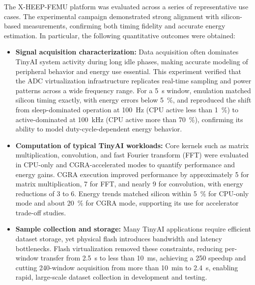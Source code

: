             The \mbox{X-HEEP-FEMU} platform was evaluated across a series of representative use cases. The experimental campaign demonstrated strong alignment with silicon-based measurements, confirming both timing fidelity and accurate energy estimation. In particular, the following quantitative outcomes were obtained:
    
            \vspace{-1em}
            \begin{itemize}
                \item \textbf{Signal acquisition characterization:} Data acquisition often dominates TinyAI system activity during long idle phases, making accurate modeling of peripheral behavior and energy use essential. This experiment verified that the ADC virtualization infrastructure replicates real-time sampling and power patterns across a wide frequency range. For a \SI{5}{\second} window, emulation matched silicon timing exactly, with energy errors below \SI{5}{\percent}, and reproduced the shift from sleep-dominated operation at \SI{100}{\hertz} (CPU active less than \SI{1}{\percent}) to active-dominated at \SI{100}{\kilo\hertz} (CPU active more than \SI{70}{\percent}), confirming its ability to model duty-cycle-dependent energy behavior.
            
                \item \textbf{Computation of typical TinyAI workloads:} Core kernels such as matrix multiplication, convolution, and fast Fourier transform (FFT) were evaluated in CPU-only and CGRA-accelerated modes to quantify performance and energy gains. CGRA execution improved performance by approximately \SI{5}{\times} for matrix multiplication, \SI{7}{\times} for FFT, and nearly \SI{9}{\times} for convolution, with energy reductions of \SI{3}{\times} to \SI{6}{\times}. Energy trends matched silicon within \SI{5}{\percent} for CPU-only mode and about \SI{20}{\percent} for CGRA mode, supporting its use for accelerator trade-off studies.
            
                \item \textbf{Sample collection and storage:} Many TinyAI applications require efficient dataset storage, yet physical flash introduces bandwidth and latency bottlenecks. Flash virtualization removed these constraints, reducing per-window transfer from \SI{2.5}{\second} to less than \SI{10}{\milli\second}, achieving a \SI{250}{\times} speedup and cutting 240-window acquisition from more than \SI{10}{\minute} to \SI{2.4}{\second}, enabling rapid, large-scale dataset collection in development and testing.
            \end{itemize}
            \vspace{-1em}
     
